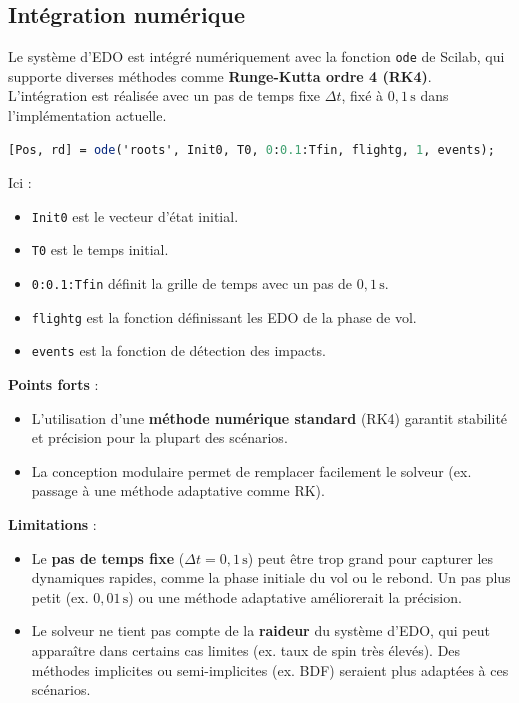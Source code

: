 \documentclass[10pt,a4paper]{report}
\begin{document}
\subsection{Intégration numérique}
\label{subsec:numerical_integration}

Le système d'EDO est intégré numériquement avec la fonction \texttt{ode} de Scilab, qui supporte diverses méthodes comme \textbf{Runge-Kutta ordre 4 (RK4)}. L'intégration est réalisée avec un pas de temps fixe \( \Delta t \), fixé à \( 0{,}1 \, \text{s} \) dans l'implémentation actuelle.

\begin{lstlisting}[language=Scilab]
[Pos, rd] = ode('roots', Init0, T0, 0:0.1:Tfin, flightg, 1, events);
\end{lstlisting}
Ici :
\begin{itemize}
    \item \texttt{Init0} est le vecteur d'état initial.
    \item \texttt{T0} est le temps initial.
    \item \texttt{0:0.1:Tfin} définit la grille de temps avec un pas de \( 0{,}1 \, \text{s} \).
    \item \texttt{flightg} est la fonction définissant les EDO de la phase de vol.
    \item \texttt{events} est la fonction de détection des impacts.
\end{itemize}

\textbf{Points forts} :
\begin{itemize}
    \item L'utilisation d'une \textbf{méthode numérique standard} (RK4) garantit stabilité et précision pour la plupart des scénarios.
    \item La conception modulaire permet de remplacer facilement le solveur (ex. passage à une méthode adaptative comme RK).
\end{itemize}

\textbf{Limitations} :
\begin{itemize}
    \item Le \textbf{pas de temps fixe} (\( \Delta t = 0{,}1 \, \text{s} \)) peut être trop grand pour capturer les dynamiques rapides, comme la phase initiale du vol ou le rebond. Un pas plus petit (ex. \( 0{,}01 \, \text{s} \)) ou une méthode adaptative améliorerait la précision.
    \item Le solveur ne tient pas compte de la \textbf{raideur} du système d'EDO, qui peut apparaître dans certains cas limites (ex. taux de spin très élevés). Des méthodes implicites ou semi-implicites (ex. BDF) seraient plus adaptées à ces scénarios.
\end{itemize}
\end{document}
